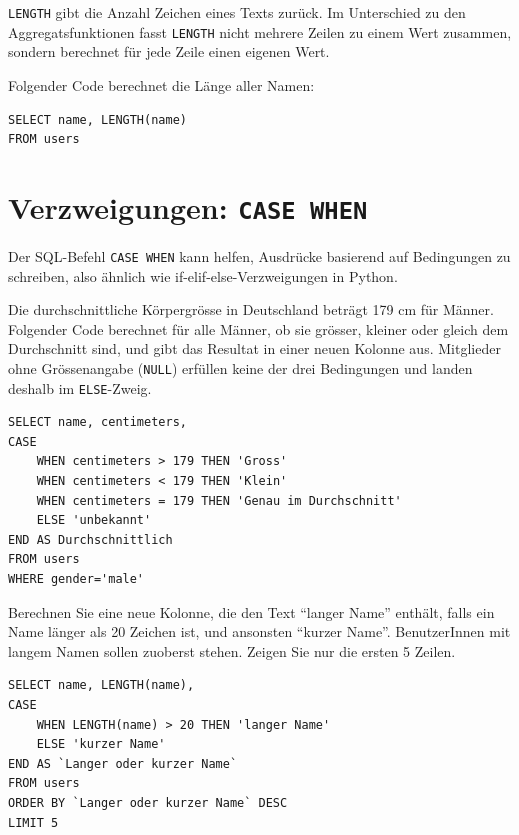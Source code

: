 \lstinline|LENGTH| gibt die Anzahl Zeichen eines Texts zurück. Im Unterschied zu den Aggregatsfunktionen fasst \lstinline|LENGTH| nicht mehrere Zeilen zu einem Wert zusammen, sondern berechnet für jede Zeile einen eigenen Wert.

\begin{myexample}
Folgender Code berechnet die Länge aller Namen:

\begin{lstlisting}
SELECT name, LENGTH(name)
FROM users
\end{lstlisting}
\end{myexample}

\section{Verzweigungen: \texorpdfstring{\lstinline|CASE WHEN|}{CASE WHEN}}

Der SQL-Befehl \lstinline|CASE WHEN| kann helfen, Ausdrücke basierend auf Bedingungen zu schreiben, also ähnlich wie if-elif-else-Verzweigungen in Python.

\begin{myexample}
Die durchschnittliche Körpergrösse in Deutschland beträgt 179 cm für Männer. Folgender Code berechnet für alle Männer, ob sie grösser, kleiner oder gleich dem Durchschnitt sind, und gibt das Resultat in einer neuen Kolonne aus. Mitglieder ohne Grössenangabe (\lstinline|NULL|) erfüllen keine der drei Bedingungen und landen deshalb im \lstinline|ELSE|-Zweig.

\begin{lstlisting}
SELECT name, centimeters,
CASE
	WHEN centimeters > 179 THEN 'Gross'
    WHEN centimeters < 179 THEN 'Klein'
    WHEN centimeters = 179 THEN 'Genau im Durchschnitt'
    ELSE 'unbekannt'
END AS Durchschnittlich
FROM users
WHERE gender='male'
\end{lstlisting}
\end{myexample}

\begin{myexercise}
  Berechnen Sie eine neue Kolonne, die den Text \enquote{langer Name} enthält, falls ein Name länger als 20 Zeichen ist, und ansonsten \enquote{kurzer Name}. BenutzerInnen mit langem Namen sollen zuoberst stehen. Zeigen Sie nur die ersten 5 Zeilen.
  \begin{myanswer}
    \begin{lstlisting}
SELECT name, LENGTH(name),
CASE
    WHEN LENGTH(name) > 20 THEN 'langer Name'
    ELSE 'kurzer Name'
END AS `Langer oder kurzer Name`
FROM users
ORDER BY `Langer oder kurzer Name` DESC
LIMIT 5
\end{lstlisting}
  \end{myanswer}
\end{myexercise}

